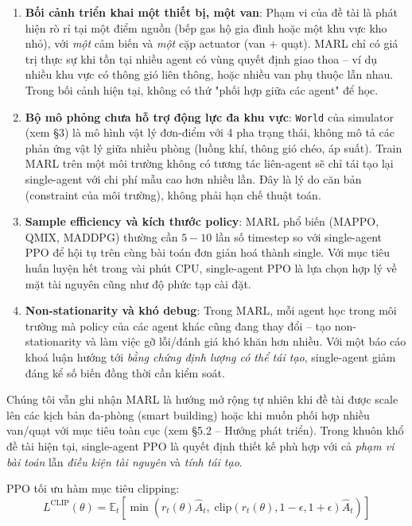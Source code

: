 \begin{enumerate}
  \item \textbf{Bối cảnh triển khai một thiết bị, một van}: Phạm vi của đề tài là phát hiện rò rỉ tại một điểm nguồn (bếp gas hộ gia đình hoặc một khu vực kho nhỏ), với \emph{một} cảm biến và \emph{một} cặp actuator (van + quạt). MARL chỉ có giá trị thực sự khi tồn tại nhiều agent có vùng quyết định giao thoa -- ví dụ nhiều khu vực có thông gió liên thông, hoặc nhiều van phụ thuộc lẫn nhau. Trong bối cảnh hiện tại, không có thứ "phối hợp giữa các agent" để học.

  \item \textbf{Bộ mô phỏng chưa hỗ trợ động lực đa khu vực}: \texttt{World} của simulator (xem §3) là mô hình vật lý đơn-điểm với 4 pha trạng thái, không mô tả các phản ứng vật lý giữa nhiều phòng (luồng khí, thông gió chéo, áp suất). Train MARL trên một môi trường không có tương tác liên-agent sẽ chỉ tái tạo lại single-agent với chi phí mẫu cao hơn nhiều lần. Đây là lý do căn bản (constraint của môi trường), không phải hạn chế thuật toán.

  \item \textbf{Sample efficiency và kích thước policy}: MARL phổ biến (MAPPO, QMIX, MADDPG) thường cần $5\!-\!10$ lần số timestep so với single-agent PPO để hội tụ trên cùng bài toán đơn giản hoá thành single. Với mục tiêu huấn luyện hết trong vài phút CPU, single-agent PPO là lựa chọn hợp lý về mặt tài nguyên cũng như độ phức tạp cài đặt.

  \item \textbf{Non-stationarity và khó debug}: Trong MARL, mỗi agent học trong môi trường mà policy của các agent khác cũng đang thay đổi -- tạo non-stationarity và làm việc gỡ lỗi/đánh giá khó khăn hơn nhiều. Với một báo cáo khoá luận hướng tới \emph{bằng chứng định lượng có thể tái tạo}, single-agent giảm đáng kể số biến đồng thời cần kiểm soát.
\end{enumerate}

Chúng tôi vẫn ghi nhận MARL là hướng mở rộng tự nhiên khi đề tài được scale lên các kịch bản đa-phòng (smart building) hoặc khi muốn phối hợp nhiều van/quạt với mục tiêu toàn cục (xem §5.2 -- Hướng phát triển). Trong khuôn khổ đề tài hiện tại, single-agent PPO là quyết định thiết kế phù hợp với cả \emph{phạm vi bài toán} lẫn \emph{điều kiện tài nguyên} và \emph{tính tái tạo}.

PPO tối ưu hàm mục tiêu clipping:
\begin{equation}
  L^{\text{CLIP}}(\theta) = \mathbb{E}_t \left[ \min\left( r_t(\theta) \hat{A}_t, \; \text{clip}(r_t(\theta), 1-\epsilon, 1+\epsilon) \hat{A}_t \right) \right]
\end{equation}

